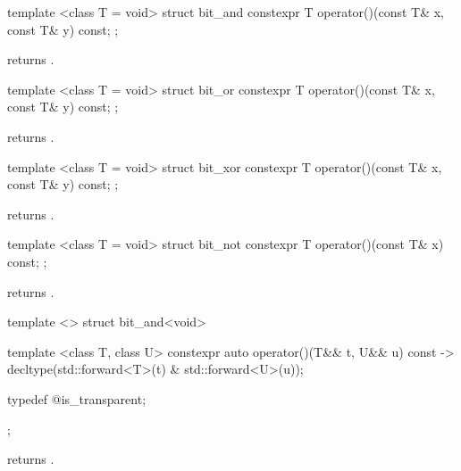 %
\begin{itemdecl}
template <class T = void> struct bit_and {
  constexpr T operator()(const T& x, const T& y) const;
};
\end{itemdecl}

\begin{itemdescr}
\pnum
{} returns .
\end{itemdescr}

%
\begin{itemdecl}
template <class T = void> struct bit_or {
  constexpr T operator()(const T& x, const T& y) const;
};
\end{itemdecl}

\begin{itemdescr}
\pnum
{} returns .
\end{itemdescr}

%
\begin{itemdecl}
template <class T = void> struct bit_xor {
  constexpr T operator()(const T& x, const T& y) const;
};
\end{itemdecl}

\begin{itemdescr}
\pnum
{} returns .
\end{itemdescr}

\begin{itemdecl}
template <class T = void> struct bit_not {
  constexpr T operator()(const T& x) const;
};
\end{itemdecl}

\begin{itemdescr}
\pnum
{} returns .
\end{itemdescr}

%
\begin{itemdecl}
template <> struct bit_and<void> {
  template <class T, class U> constexpr auto operator()(T&& t, U&& u) const
    -> decltype(std::forward<T>(t) & std::forward<U>(u));

  typedef @\unspec@ is_transparent;
};
\end{itemdecl}

\begin{itemdescr}
\pnum
{} returns .
\end{itemdescr}

